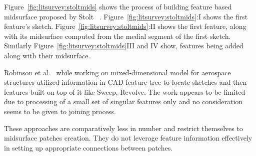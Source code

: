
Figure~\ref{fig:litsurvey:stoltmids} shows the process of building feature based midsurface proposed by Stolt ~\cite{Stolt2006}. Figure~\ref{fig:litsurvey:stoltmids}:I shows the first feature's sketch. Figure~\ref{fig:litsurvey:stoltmids}:II shows the first feature, along with its midsurface computed from the medial segment of the first sketch. Similarly Figure~\ref{fig:litsurvey:stoltmids}III and IV show, features being added along with their midsurface.

Robinson et al.~\cite{Robinson2007} while working on mixed-dimensional model for aerospace structures utilized information in CAD feature tree to locate sketches and then features built on top of it like Sweep, Revolve. The work appears to be limited due to processing of a small set of singular features only and no consideration seems to be given to joining process.

These approaches are comparatively less in number and restrict themselves to midsurface patches creation. They do not leverage feature information effectively in setting up appropriate connections between patches.




